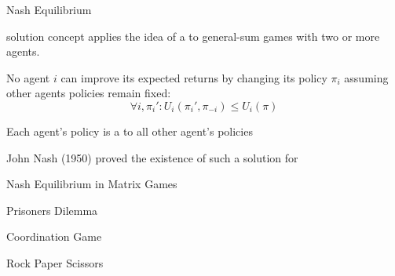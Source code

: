 \begin{frame}{Nash Equilibrium}

     solution concept applies the idea of a  to general-sum games with two or more agents.

    \blist
        \item No agent \(i\) can improve its expected returns by changing its policy \(\pi_i\) assuming other agents policies remain fixed:
   		$$\forall i , \pi_{i}': U_{i}(\pi_{i}', \pi_{-i}) \le U_{i}(\pi)$$
   		
        \item Each agent's policy is a  to all other agent's policies
        
        \item John Nash (1950) proved the existence of such a solution for 
    \elist
        
\end{frame}

\begin{frame}{Nash Equilibrium in Matrix Games}

        \centering
        \begin{minipage}[bt]{0.32\textwidth}
            \centering
            \gamepd
            
            \vspace{5pt}
            Prisoners Dilemma
            
        \end{minipage}\hfill
        \begin{minipage}[bt]{0.32\textwidth}
            \centering
            \gamecoord
            
            \vspace{5pt}
            Coordination Game
            
        \end{minipage}\hfill
        \begin{minipage}[bt]{0.32\textwidth}
            \centering
            \gamerps
            
            \vspace{5pt}
            Rock Paper Scissors
            
        \end{minipage}
    
    \vspace{15pt}
    
    

\end{frame}

